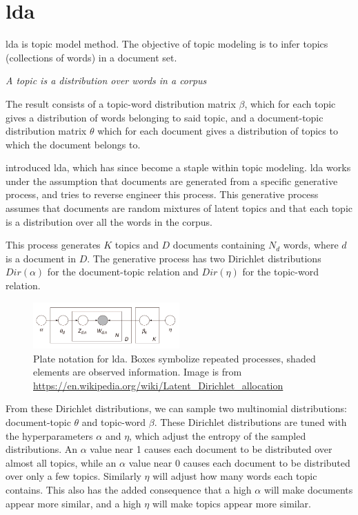 \section{\acrlong{lda}}\label{sec:lda}
\Gls{lda} is topic model method. The objective of topic modeling is to infer topics (collections of words) in a document set.

\begin{definition}\label{def:topic}
	\textit{A topic is a distribution over words in a corpus}
\end{definition}

The result consists of a topic-word distribution matrix $\beta$, which for each topic gives a distribution of words belonging to said topic, and a document-topic distribution matrix $\theta$ which for each document gives a distribution of topics to which the document belongs to.

\citeauthor{lda} \cite{lda} introduced \gls{lda}, which has since become a staple within topic modeling.
\gls{lda} works under the assumption that documents are generated from a specific generative process, and tries to reverse engineer this process.
This generative process assumes that documents are random mixtures of latent topics and that each topic is a distribution over all the words in the corpus.

This process generates $K$ topics and $D$ documents containing $N_{d}$ words, where $d$ is a document in $D$.
The generative process has two Dirichlet distributions $Dir(\alpha)$ for the document-topic relation and $Dir(\eta)$ for the topic-word relation.

\begin{figure}[h]
	\centering
	\includegraphics[width=0.5\textwidth]{figures/Smoothed_LDA.jpg}
	\caption{Plate notation for \gls{lda}. Boxes symbolize repeated processes, shaded elements are observed information. Image is from \url{https://en.wikipedia.org/wiki/Latent_Dirichlet_allocation}}
	\label{fig:lda}
\end{figure}
From these Dirichlet distributions, we can sample two multinomial distributions: document-topic $\theta$ and topic-word $\beta$.
These Dirichlet distributions are tuned with the hyperparameters $\alpha$ and $\eta$, which adjust the entropy of the sampled distributions.
An $\alpha$ value near 1 causes each document to be distributed over almost all topics, while an $\alpha$ value near 0 causes each document to be distributed over only a few topics.
Similarly $\eta$ will adjust how many words each topic contains.
This also has the added consequence that a high $\alpha$ will make documents appear more similar, and a high $\eta$ will make topics appear more similar.

